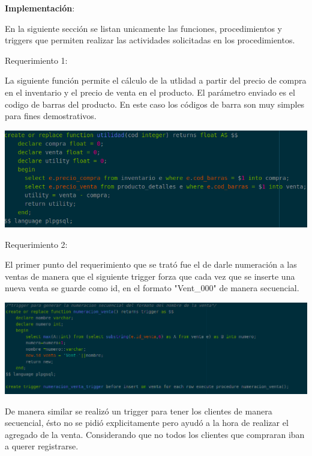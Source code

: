 \documentclass[12pt, letterpaper]{article}     %
\begin{document}
	\textbf{Implementación}:
		\vspace{5mm} %

	
	En la siguiente sección se listan unicamente las funciones, procedimientos y triggers que permiten realizar las actividades solicitadas en los procedimientos.
	
	\vspace{5mm} %
	Requerimiento 1:

	La siguiente función permite el cálculo de la utlidad a partir del precio de compra en el inventario y el precio de venta en el producto. El parámetro enviado es el codigo de barras del producto. En este caso los códigos de barra son muy simples para fines demostrativos.
	
		
	\begin{center}
   	\includegraphics[scale=0.50]{req1}
	\end{center}
	
	\pagebreak
	Requerimiento 2:

	El primer punto del requerimiento que se trató fue el de darle numeración a las ventas de manera que el siguiente trigger forza que cada vez que se inserte una nueva venta se guarde como id, en el formato "Vent\_000" de manera secuencial.
	
		
	\begin{center}
   	\includegraphics[scale=0.40]{req22}
	\end{center}
	
	De manera similar se realizó un trigger para tener los clientes de manera secuencial, ésto no se pidió explicitamente pero ayudó a la hora de realizar el agregado de la venta. Considerando que no todos los clientes que compraran iban a querer registrarse.
	
\end{document}
